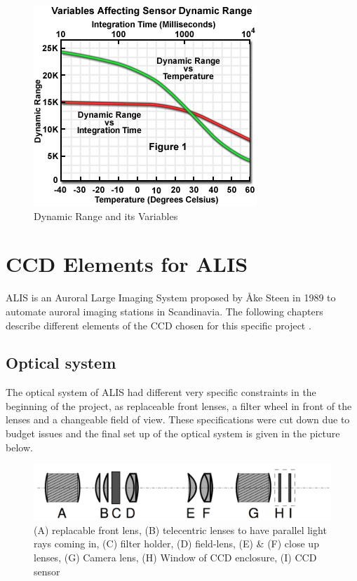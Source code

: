 \begin{figure}[!htbp]
	\centering
	\includegraphics[width=0.6\linewidth]{images/dynrange}
		\caption{Dynamic Range and its Variables \citep[c.f.][\href{https://micro.magnet.fsu.edu/primer/digitalimaging/concepts/images/dynamicrangefigure1.jpg}{Dynamic Range Figure}]{ccdimaging} }
		 \label{fig:dynrange}
\end{figure}







\section{CCD Elements for ALIS}
ALIS is an Auroral Large Imaging System proposed by Åke Steen in 1989 to automate auroral imaging stations in Scandinavia. The following chapters describe different elements of the CCD chosen for this specific project \citep{brandstrom2003auroral}.

\subsection{Optical system}
The optical system of ALIS had different very specific constraints in the beginning of the project, as replaceable front lenses, a filter wheel in front of the lenses and a changeable field of view. These specifications were cut down due to budget issues and the final set up of the optical system is given in the picture below.

\begin{figure}[!htbp]
	\centering
	\includegraphics[width=0.8\linewidth]{images/optsys}
		\caption{(A) replacable front lens, (B) telecentric lenses to have parallel light rays coming in, (C) filter holder, (D) field-lens, (E) \& (F) close up lenses, (G) Camera lens, (H) Window of CCD enclosure, (I) CCD sensor \citep[c.f.][Fig. 3.7, modified]{brandstrom2003auroral}}
		 \label{fig:optsys}
\end{figure}

